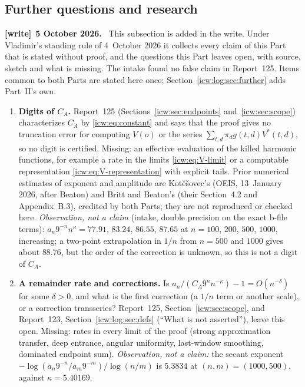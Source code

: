 \documentclass[11pt,letterpaper]{article}
\theoremstyle{remark}\newtheorem{remark}[theorem]{Remark}
\newcommand{\1}{\mathbf1}
\newenvironment{writenote}[1][]{\par\smallskip\begingroup\small
 \noindent\textbf{[write]}\if\relax\detokenize{#1}\relax\else~\textbf{#1.}\fi\ }%
 {\par\endgroup\smallskip}
\begin{document}
\subsection{Further questions and research}\label{icw:sub:further}
\begin{writenote}[5 October 2026]
This subsection is added in the write. Under Vladimir's standing rule of 4~October 2026 it collects every claim of this Part that is stated without proof, and the questions this Part leaves open, with source, sketch and what is missing. The intake found no false claim in Report~125. Items common to both Parts are stated here once; Section~\ref{icw:log:sec:further} adds Part~II's own.
\end{writenote}
\begin{enumerate}[label=\arabic*.,ref=\arabic*]
\item\label{icw:q:digits} \textbf{Digits of $C_A$.} Report~125 (Sections~\ref{icw:sec:endpoints} and~\ref{icw:sec:scope}) characterizes $C_A$ by \eqref{icw:eq:constant} and says that the proof gives no truncation error for computing $V(o)$ or the series $\sum_{t,d}\pi_dg(t,d)V^*(t,d)$, so no digit is certified. Missing: an effective evaluation of the killed harmonic functions, for example a rate in the limits \eqref{icw:eq:V-limit} or a computable representation \eqref{icw:eq:V-representation} with explicit tails. Prior numerical estimates of exponent and amplitude are Kot\v{e}\v{s}ovec's (OEIS, 13~January 2026, after Beaton) and Britt and Beaton's (their Section~4.2 and Appendix~B.3), credited by both Parts; they are not reproduced or checked here. \emph{Observation, not a claim} (intake, double precision on the exact b-file terms): $a_n9^{-n}n^\kappa=77.91$, $83.24$, $86.55$, $87.65$ at $n=100$, $200$, $500$, $1000$, increasing; a two-point extrapolation in $1/n$ from $n=500$ and $1000$ gives about $88.76$, but the order of the correction is unknown, so this is not a digit of $C_A$.
\item\label{icw:q:rate} \textbf{A remainder rate and corrections.} Is $a_n/(C_A9^nn^{-\kappa})-1=O(n^{-\delta})$ for some $\delta>0$, and what is the first correction (a $1/n$ term or another scale), or a correction transseries? Report~125, Section~\ref{icw:sec:scope}, and Report~123, Section~\ref{icw:log:sec:defs} (``What is not asserted''), leave this open. Missing: rates in every limit of the proof (strong approximation transfer, deep entrance, angular uniformity, last-window smoothing, dominated endpoint sum). \emph{Observation, not a claim:} the secant exponent $-\log(a_n9^{-n}/a_m9^{-m})/\log(n/m)$ is $5.3834$ at $(n,m)=(1000,500)$, against $\kappa=5.40169$.

\end{enumerate}
\end{document}
